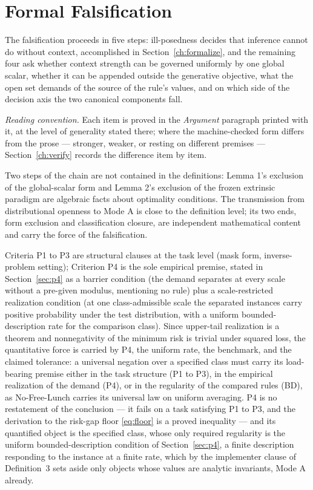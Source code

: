 \section{Formal Falsification}
\label{ch:falsify}

The falsification proceeds in five steps: ill-posedness decides that inference cannot do without context, accomplished in Section~\ref{ch:formalize}, and the remaining four ask whether context strength can be governed uniformly by one global scalar, whether it can be appended outside the generative objective, what the open set demands of the source of the rule's values, and on which side of the decision axis the two canonical components fall.

\emph{Reading convention.} Each item is proved in the \emph{Argument} paragraph printed with it, at the level of generality stated there; where the machine-checked form differs from the prose --- stronger, weaker, or resting on different premises --- Section~\ref{ch:verify} records the difference item by item.

Two steps of the chain are not contained in the definitions: Lemma 1's exclusion of the global-scalar form and Lemma 2's exclusion of the frozen extrinsic paradigm are algebraic facts about optimality conditions. The transmission from distributional openness to Mode A is close to the definition level; its two ends, form exclusion and classification closure, are independent mathematical content and carry the force of the falsification.

Criteria P1 to P3 are structural clauses at the task level (mask form, inverse-problem setting); Criterion P4 is the sole empirical premise, stated in Section~\ref{sec:p4} as a barrier condition (the demand separates at every scale without a pre-given modulus, mentioning no rule) plus a scale-restricted realization condition (at one class-admissible scale the separated instances carry positive probability under the test distribution, with a uniform bounded-description rate for the comparison class). Since upper-tail realization is a theorem and nonnegativity of the minimum risk is trivial under squared loss, the quantitative force is carried by P4, the uniform rate, the benchmark, and the claimed tolerance: a universal negation over a specified class must carry its load-bearing premise either in the task structure (P1 to P3), in the empirical realization of the demand (P4), or in the regularity of the compared rules (BD), as No-Free-Lunch carries its universal law on uniform averaging. P4 is no restatement of the conclusion --- it fails on a task satisfying P1 to P3, and the derivation to the risk-gap floor \eqref{eq:floor} is a proved inequality --- and its quantified object is the specified class, whose only required regularity is the uniform bounded-description condition of Section~\ref{sec:p4}, a finite description responding to the instance at a finite rate, which by the implementer clause of Definition~3 sets aside only objects whose values are analytic invariants, Mode A already.

